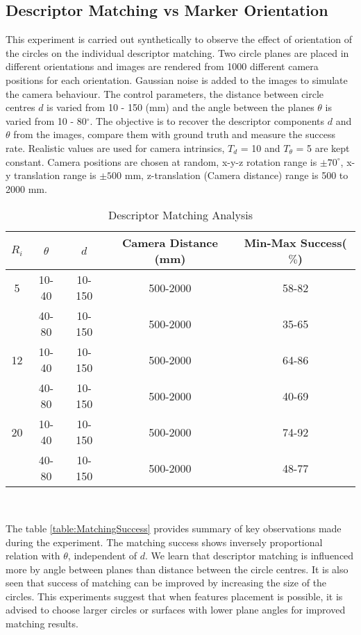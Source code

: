 \documentclass{bmvc2k}
\begin{document}
\subsection{Descriptor Matching vs Marker Orientation}
This experiment is carried out synthetically to observe the effect of orientation of the circles on the individual descriptor matching.
Two circle planes are placed in different orientations and images are rendered from 1000 different camera positions for each orientation. Gaussian noise is added to the images to simulate the camera behaviour. 
The control parameters, the distance between circle centres $ d $ is varied from 10 - 150 (mm) and the angle between the planes $ \theta $ is varied from 10 - 80$ ^\circ $. 
The objective is to recover the descriptor components $ d $ and $ \theta $ from the images, compare them with ground truth and measure the success rate. 
Realistic values are used for camera intrinsics, $ T_{d} $ = 10 and $ T_\theta $ = 5 are kept constant. 
Camera positions are chosen at random, x-y-z rotation range is $ \pm 70^\circ $, x-y translation range is $ \pm 500 $ mm, z-translation (Camera distance) range is 500 to 2000 mm. 

\begin{table}[tb]
\centering
\caption{Descriptor Matching Analysis } \label{table:MatchingSuccess}
\begin{tabular}{|c | c | c | c | c |}
\hline
$ R_i $ & $ \theta $ & $ d $ & Camera Distance (mm) & Min-Max Success($ \% $) \\ \hline
5 & 10-40 & 10-150 & 500-2000 & 58-82 \\
 {}& 40-80 & 10-150 & 500-2000 & 35-65 \\ \hline
12 & 10-40 & 10-150 & 500-2000 & 64-86 \\
{}& 40-80 & 10-150& 500-2000 & 40-69 \\ \hline
 20 & 10-40 & 10-150 & 500-2000 & 74-92 \\
{} & 40-80 & 10-150 & 500-2000  & 48-77 \\ \hline 
\end{tabular} \\
\label{tab:Exp1}
\end{table}
The table \ref{table:MatchingSuccess} provides summary of key observations made during the experiment. 
The matching success shows inversely proportional relation with $ \theta $, independent of $ d $. 
We learn that descriptor matching is influenced more by angle between planes than distance between the circle centres. 
It is also seen that success of matching can be improved by increasing the size of the circles. 
This experiments suggest that when features placement is possible, it is advised to choose larger circles or surfaces with lower plane angles for improved matching results. 
\end{document}
